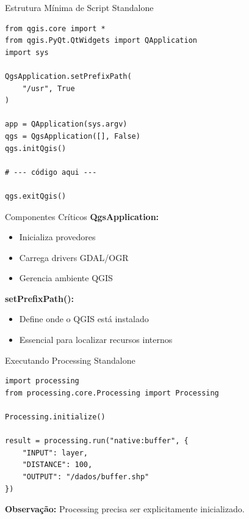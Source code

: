 \documentclass{beamer}
\begin{document}
\begin{frame}[fragile]{Estrutura Mínima de Script Standalone}
    \begin{verbatim}
from qgis.core import *
from qgis.PyQt.QtWidgets import QApplication
import sys

QgsApplication.setPrefixPath(
    "/usr", True
)

app = QApplication(sys.argv)
qgs = QgsApplication([], False)
qgs.initQgis()

# --- código aqui ---

qgs.exitQgis()
    \end{verbatim}
\end{frame}

\begin{frame}{Componentes Críticos}
    \textbf{QgsApplication:}
    \begin{itemize}
        \item Inicializa provedores
        \item Carrega drivers GDAL/OGR
        \item Gerencia ambiente QGIS
    \end{itemize}
    
    \vspace{0.4cm}
    
    \textbf{setPrefixPath():}
    \begin{itemize}
        \item Define onde o QGIS está instalado
        \item Essencial para localizar recursos internos
    \end{itemize}
\end{frame}


\begin{frame}[fragile]{Executando Processing Standalone}
    \begin{verbatim}
import processing
from processing.core.Processing import Processing

Processing.initialize()

result = processing.run("native:buffer", {
    "INPUT": layer,
    "DISTANCE": 100,
    "OUTPUT": "/dados/buffer.shp"
})
    \end{verbatim}
    
    \textbf{Observação:}
    Processing precisa ser explicitamente inicializado.
\end{frame}
\end{document}
